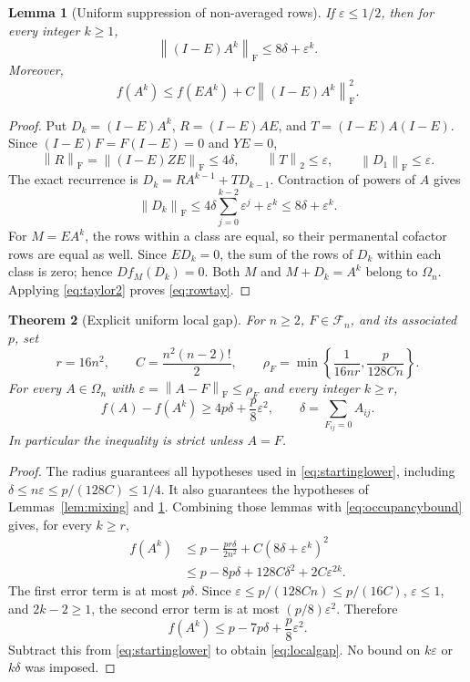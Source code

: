 \documentclass[11pt]{article}
\newtheorem{theorem}{Theorem}[section]
\newtheorem{lemma}[theorem]{Lemma}
\theoremstyle{remark}\newtheorem{remark}[theorem]{Remark}
\newcommand{\Om}{\Omega_n}
\newcommand{\Fset}{\mathcal F_n}
\newcommand{\fn}[1]{\left\|#1\right\|_{\mathrm F}}
\newcommand{\op}[1]{\left\|#1\right\|_{2}}
\newcommand{\eps}{\varepsilon}
\begin{document}
\begin{lemma}[Uniform suppression of non-averaged rows]\label{lem:fast}
If $\eps\le1/2$, then for every integer $k\ge1$,
\begin{equation}\label{eq:fast}
 \fn{(I-E)A^k}\le8\delta+\eps^k.
\end{equation}
Moreover,
\begin{equation}\label{eq:rowtay}
 f(A^k)\le f(EA^k)+C\fn{(I-E)A^k}^2.
\end{equation}
\end{lemma}
\begin{proof}
Put $D_k=(I-E)A^k$, $R=(I-E)AE$, and $T=(I-E)A(I-E)$.
Since $(I-E)F=F(I-E)=0$ and $YE=0$,
\[
 \fn R=\fn{(I-E)ZE}\le4\delta,
 \qquad\op T\le\eps,
 \qquad\fn{D_1}\le\eps.
\]
The exact recurrence is $D_k=RA^{k-1}+TD_{k-1}$. Contraction of powers
of $A$ gives
\[
 \fn{D_k}\le4\delta\sum_{j=0}^{k-2}\eps^j+\eps^k
 \le8\delta+\eps^k.
\]
For $M=EA^k$, the rows within a class are equal, so their permanental
cofactor rows are equal as well. Since $ED_k=0$, the sum of the rows of
$D_k$ within each class is zero; hence $Df_M(D_k)=0$. Both $M$ and
$M+D_k=A^k$ belong to $\Om$. Applying \eqref{eq:taylor2} proves
\eqref{eq:rowtay}.
\end{proof}

\begin{theorem}[Explicit uniform local gap]\label{thm:local}
For $n\ge2$, $F\in\Fset$, and its associated $p$, set
\begin{equation}\label{eq:radius}
 r=16n^2,\qquad C=\frac{n^2(n-2)!}{2},\qquad
 \rho_F=\min\left\{\frac1{16nr},\frac{p}{128Cn}\right\}.
\end{equation}
For every $A\in\Om$ with $\eps=\fn{A-F}\le\rho_F$ and every integer
$k\ge r$,
\begin{equation}\label{eq:localgap}
 f(A)-f(A^k)\ge4p\delta+\frac p8\eps^2,
 \qquad \delta=\sum_{F_{ij}=0}A_{ij}.
\end{equation}
In particular the inequality is strict unless $A=F$.
\end{theorem}
\begin{proof}
The radius guarantees all hypotheses used in
\eqref{eq:startinglower}, including $\delta\le n\eps\le p/(128C)\le1/4$.
It also guarantees the hypotheses of Lemmas~\ref{lem:mixing} and
\ref{lem:fast}. Combining those lemmas with
\eqref{eq:occupancybound} gives, for every $k\ge r$,
\begin{align*}
 f(A^k)&\le p-\frac{pr\delta}{2n^2}
       +C(8\delta+\eps^k)^2\\
 &\le p-8p\delta+128C\delta^2+2C\eps^{2k}.
\end{align*}
The first error term is at most $p\delta$. Since
$\eps\le p/(128Cn)\le p/(16C)$, $\eps\le1$, and $2k-2\ge1$,
the second error term is at most $(p/8)\eps^2$. Therefore
\[
 f(A^k)\le p-7p\delta+\frac p8\eps^2.
\]
Subtract this from \eqref{eq:startinglower} to obtain
\eqref{eq:localgap}. No bound on $k\eps$ or $k\delta$ was imposed.
\end{proof}
\end{document}

